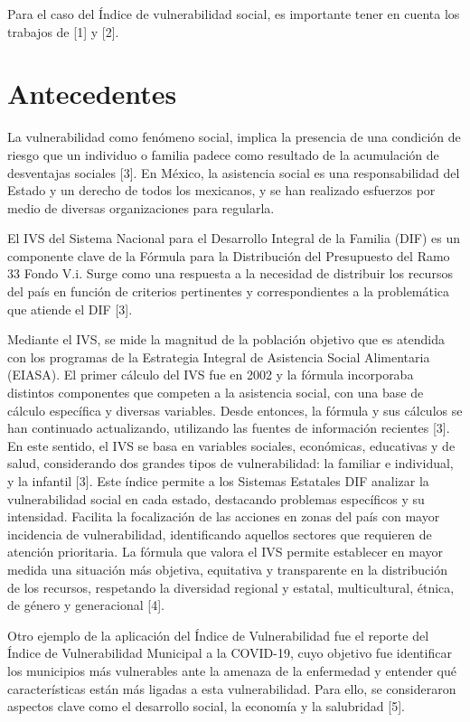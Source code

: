 \documentclass[
  letterpaper,
  DIV=11,
  numbers=noendperiod]{scrreprt}
\begin{document}
Para el caso del Índice de vulnerabilidad social, es importante tener en
cuenta los trabajos de {[}1{]} y {[}2{]}.


\chapter{Antecedentes}\label{antecedentes}

La vulnerabilidad como fenómeno social, implica la presencia de una
condición de riesgo que un individuo o familia padece como resultado de
la acumulación de desventajas sociales {[}3{]}. En México, la asistencia
social es una responsabilidad del Estado y un derecho de todos los
mexicanos, y se han realizado esfuerzos por medio de diversas
organizaciones para regularla.

El IVS del Sistema Nacional para el Desarrollo Integral de la Familia
(DIF) es un componente clave de la Fórmula para la Distribución del
Presupuesto del Ramo 33 Fondo V.i. Surge como una respuesta a la
necesidad de distribuir los recursos del país en función de criterios
pertinentes y correspondientes a la problemática que atiende el DIF
{[}3{]}.

Mediante el IVS, se mide la magnitud de la población objetivo que es
atendida con los programas de la Estrategia Integral de Asistencia
Social Alimentaria (EIASA). El primer cálculo del IVS fue en 2002 y la
fórmula incorporaba distintos componentes que competen a la asistencia
social, con una base de cálculo específica y diversas variables. Desde
entonces, la fórmula y sus cálculos se han continuado actualizando,
utilizando las fuentes de información recientes {[}3{]}. En este
sentido, el IVS se basa en variables sociales, económicas, educativas y
de salud, considerando dos grandes tipos de vulnerabilidad: la familiar
e individual, y la infantil {[}3{]}. Este índice permite a los Sistemas
Estatales DIF analizar la vulnerabilidad social en cada estado,
destacando problemas específicos y su intensidad. Facilita la
focalización de las acciones en zonas del país con mayor incidencia de
vulnerabilidad, identificando aquellos sectores que requieren de
atención prioritaria. La fórmula que valora el IVS permite establecer en
mayor medida una situación más objetiva, equitativa y transparente en la
distribución de los recursos, respetando la diversidad regional y
estatal, multicultural, étnica, de género y generacional {[}4{]}.

Otro ejemplo de la aplicación del Índice de Vulnerabilidad fue el
reporte del Índice de Vulnerabilidad Municipal a la COVID-19, cuyo
objetivo fue identificar los municipios más vulnerables ante la amenaza
de la enfermedad y entender qué características están más ligadas a esta
vulnerabilidad. Para ello, se consideraron aspectos clave como el
desarrollo social, la economía y la salubridad {[}5{]}.
\end{document}
